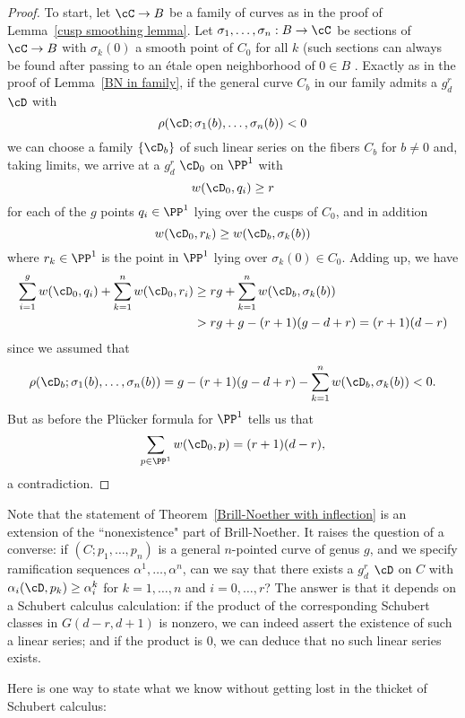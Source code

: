 \begin{proof}
To start, let $\cC \to B$ be a family of curves as in the proof of Lemma~\ref{cusp smoothing lemma}. Let $\sigma_1, \dots, \sigma_n : B \to \cC$ be sections of $\cC \to B$ with $\sigma_k(0)$ a smooth point of $C_0$ for all $k$ (such sections can always be found after passing to an \'etale open neighborhood of $0 \in B$ . Exactly as in the proof of Lemma~\ref{BN in family}, if the general curve $C_b$ in our family admits a $g^r_d$ $\cD$ with
$$
\rho(\cD;\sigma_1(b),\dots,\sigma_n(b)) < 0
$$
we can choose a family $\{\cD_b\}$ of such linear series  on the fibers $C_b$ for $b \neq 0$ and, taking limits, we arrive at a $g^r_d$ $\cD_0$ on $\PP^1$ with
$$
w(\cD_0, q_i) \geq r
$$
for each of the $g$ points $q_i \in \PP^1$ lying over the cusps of $C_0$, and in addition
$$
w(\cD_0, r_k) \geq w(\cD_b,\sigma_k(b))
$$
where $r_k \in \PP^1$ is the point in $\PP^1$ lying over $\sigma_k(0) \in C_0$. Adding up, we have
\begin{align*}
\sum_{i=1}^g w(\cD_0, q_i) + \sum_{k=1}^n w(\cD_0, r_i) &\geq rg + \sum_{k=1}^n w(\cD_b,\sigma_k(b)) \\
&> rg + g - (r+1)(g-d+r) = (r+1)(d-r)
\end{align*}
since we assumed that 
$$
\rho(\cD_b;\sigma_1(b),\dots,\sigma_n(b)) = g - (r+1)(g-d+r) - \sum_{k=1}^n w(\cD_b,\sigma_k(b)) < 0.
$$
But as before the Pl\"ucker formula for $\PP^1$ tells us that
$$
\sum_{p \in \PP^1} w(\cD_0, p) = (r+1)(d-r),
$$
a contradiction.
\end{proof}

Note that the statement of Theorem~\ref{Brill-Noether with inflection} is an extension of the ``nonexistence" part of Brill-Noether. It raises the question of a converse: if $(C;p_1,\dots,p_n)$ is a general $n$-pointed curve of genus $g$, and we specify ramification sequences $\alpha^1, \dots, \alpha^n$, can we say that there exists a $g^r_d$ $\cD$ on $C$ with $\alpha_i(\cD, p_k) \geq \alpha^k_i$ for $k=1,\dots,n$ and $i = 0, \dots, r$? The answer is that it depends on a Schubert calculus calculation: if the product of the corresponding Schubert classes in $G(d-r, d+1)$ is nonzero, we can indeed assert the existence of such a linear series; and if the product is 0, we can deduce that no such linear series exists.

Here is one way to state what we know without getting lost in the thicket of Schubert calculus:

